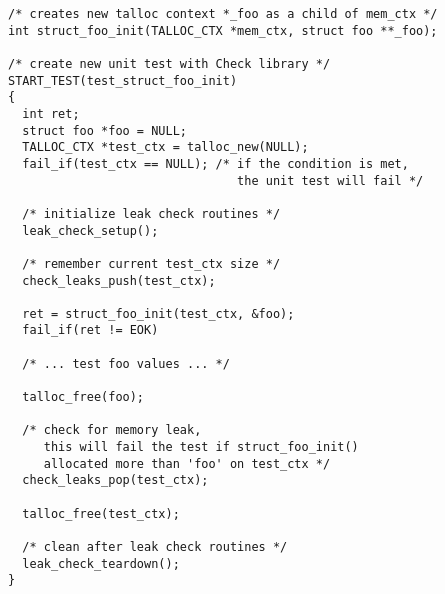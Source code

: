 \begin{lstlisting}[caption={Martin Nagy's leak check routines example},
morekeywords={leak_check_setup,check_leaks_push,
              check_leaks_pop,leak_check_teardown}]
/* creates new talloc context *_foo as a child of mem_ctx */
int struct_foo_init(TALLOC_CTX *mem_ctx, struct foo **_foo);

/* create new unit test with Check library */
START_TEST(test_struct_foo_init)
{
  int ret;
  struct foo *foo = NULL;
  TALLOC_CTX *test_ctx = talloc_new(NULL);
  fail_if(test_ctx == NULL); /* if the condition is met,
                                the unit test will fail */
  
  /* initialize leak check routines */
  leak_check_setup();
  
  /* remember current test_ctx size */
  check_leaks_push(test_ctx);
  
  ret = struct_foo_init(test_ctx, &foo);
  fail_if(ret != EOK)
  
  /* ... test foo values ... */
  
  talloc_free(foo);
  
  /* check for memory leak,
     this will fail the test if struct_foo_init()
     allocated more than 'foo' on test_ctx */
  check_leaks_pop(test_ctx);
  
  talloc_free(test_ctx);
  
  /* clean after leak check routines */
  leak_check_teardown();
}
\end{lstlisting}

% 
%     
% 
% 

\label{talloc:sec:debugging}